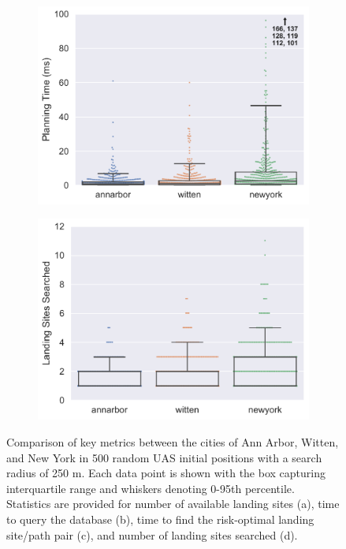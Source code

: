 \begin{figure}[ht]
\begin{subfigure}[b]{0.475\textwidth}
    \centering\includegraphics[width=\textwidth]{chapter_5_mapping/imgs/random_time_bw.pdf}
    \caption{\label{fig:ch5_random_plan_time}}
  \end{subfigure}%
  \quad
  \begin{subfigure}[b]{0.475\textwidth}
    \centering\includegraphics[width=\textwidth]{chapter_5_mapping/imgs/random_total_goal_searches_bw.pdf}
    \caption{\label{fig:ch5_random_ls_searched}}
  \end{subfigure}%
  \caption[Metrics for map-based planner]{Comparison of key metrics between the cities of Ann Arbor, Witten, and New York in 500 random \ac{UAS} initial positions with a search radius of 250 m. Each data point is shown with the box capturing interquartile range and whiskers denoting 0-95th percentile. Statistics are provided for number of available landing sites (a), time to query the database (b), time to find the risk-optimal landing site/path pair (c), and number of landing sites searched (d).}
  \label{fig:ch5_random_stats}
\end{figure}


